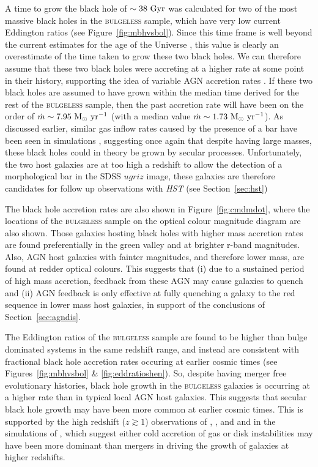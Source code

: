{A time to grow the black hole of $\sim 38 ~\rm{Gyr}$ was calculated for two of the most massive black holes in the \textsc{bulgeless} sample, which have very low current Eddington ratios (see Figure~\ref{fig:mbhvsbol}). Since this time frame is well beyond the current estimates for the age of the Universe \citep[$\sim13.8 ~\rm{Gyr}$;][]{planck16}, this value is clearly an overestimate of the time taken to grow these two black holes. We can therefore assume that these two black holes were accreting at a higher rate at some point in their history, supporting the idea of variable AGN accretion rates \citep{martini01, yu02, schawinski15}.  If these two black holes are assumed to have grown within the median time derived for the rest of the \textsc{bulgeless} sample, then the past accretion rate will have been on the order of $\dot{m} \sim 7.95 ~\rm{M}_{\odot}~\rm{yr}^{-1}$ (with a median value $\dot{m} \sim 1.73 ~\rm{M}_{\odot}~\rm{yr}^{-1}$). As discussed earlier, similar gas inflow rates caused by the presence of a bar have been seen in simulations \citep{friedli93}, suggesting once again that despite having large masses, these black holes could in theory be grown by secular processes. Unfortunately, the two host galaxies are at too high a redshift to allow the detection of a morphological bar in the SDSS $ugriz$ image, these galaxies are therefore candidates for follow up observations with \emph{HST} (see Section~\ref{sec:hst}) 

The black hole accretion rates are also shown in Figure~\ref{fig:cmdmdot}, where the locations of the \textsc{bulgeless} sample on the optical colour magnitude diagram are also shown. Those galaxies hosting black holes with higher mass accretion rates are found preferentially in the green valley and at brighter r-band magnitudes. Also, AGN host galaxies with fainter magnitudes, and therefore lower mass, are found at redder optical colours. This suggests that (i) due to a sustained period of high mass accretion, feedback from these AGN may cause galaxies to quench and (ii) AGN feedback is only effective at fully quenching a galaxy to the red sequence in lower mass host galaxies, in support of the conclusions of Section~\ref{sec:agndis}.

The Eddington ratios of the \textsc{bulgeless} sample are found to be higher than bulge dominated systems in the same redshift range, and instead are consistent with fractional black hole accretion rates occuring at earlier cosmic times (see Figures~\ref{fig:mbhvsbol} \& \ref{fig:eddratioshen}). So, despite having merger free evolutionary histories, black hole growth in the \textsc{bulgeless} galaxies is occurring at a higher rate than in typical local AGN host galaxies. This suggests that secular black hole growth may have been more common at earlier cosmic times. This is supported by the high redshift ($z\gtrsim1$) observations of \cite{georgakakis09}, \cite{cisternas11}, \cite{schawinski11} and \cite{kocevski12} and in the simulations of \cite{hopkins06c}, \cite{bournard11,bournaud12} which suggest either cold accretion of gas or disk instabilities may have been more dominant than mergers in driving the growth of galaxies at higher redshifts. 


}
